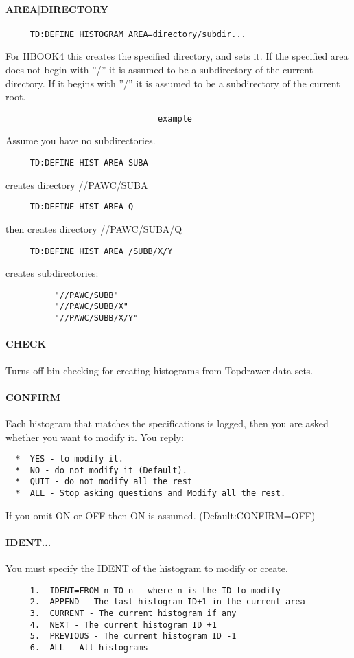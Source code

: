 \paragraph{AREA$|$DIRECTORY}
\begin{verbatim}
     TD:DEFINE HISTOGRAM AREA=directory/subdir...  
\end{verbatim}
For HBOOK4 this creates the specified directory, and sets it.  If the
specified area does not  begin  with  ''/''  it  is  assumed  to  be  a
subdirectory  of  the current directory.  If it begins with ''/'' it is
assumed to be a subdirectory of the current root.  
\begin{verbatim}
                               example
\end{verbatim}
Assume you have no subdirectories.  
\begin{verbatim}
     TD:DEFINE HIST AREA SUBA 
\end{verbatim}
creates directory //PAWC/SUBA 
\begin{verbatim}
     TD:DEFINE HIST AREA Q 
\end{verbatim}
then creates directory //PAWC/SUBA/Q 
\begin{verbatim}
     TD:DEFINE HIST AREA /SUBB/X/Y 
\end{verbatim}
creates subdirectories:  
\begin{verbatim}
          "//PAWC/SUBB" 
          "//PAWC/SUBB/X" 
          "//PAWC/SUBB/X/Y" 
\end{verbatim}
\paragraph{CHECK        }
Turns  off  bin  checking for creating histograms from Topdrawer data
sets.  
\paragraph{CONFIRM      }
Each  histogram  that  matches the specifications is logged, then you
are asked whether you want to modify it.  You reply:  
\begin{verbatim}
  *  YES - to modify it.  
  *  NO - do not modify it (Default).  
  *  QUIT - do not modify all the rest 
  *  ALL - Stop asking questions and Modify all the rest.  
\end{verbatim}
If you omit ON or OFF then ON is assumed.  
(Default:CONFIRM=OFF) 
\paragraph{IDENT...    }
You must specify the IDENT of the histogram to modify or create.  
\begin{verbatim}
     1.  IDENT=FROM n TO n - where n is the ID to modify 
     2.  APPEND - The last histogram ID+1 in the current area 
     3.  CURRENT - The current histogram if any 
     4.  NEXT - The current histogram ID +1 
     5.  PREVIOUS - The current histogram ID -1 
     6.  ALL - All histograms 
\end{verbatim}

